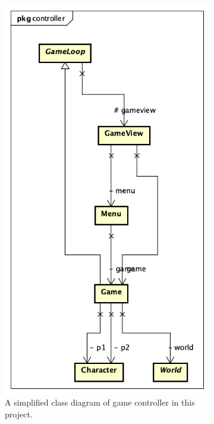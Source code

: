 \begin{figure}[h!]
\begin{subfigure}{.5\textwidth}
\centering
  \includegraphics[width=.9\linewidth]{Controller_Class_Diagram}  
  \caption{A simplified class diagram of game controller in this project.}
  \label{fig:sub-first}
\end{subfigure}
\begin{subfigure}{.5\textwidth}
  \centering

\end{subfigure}
\end{figure}
